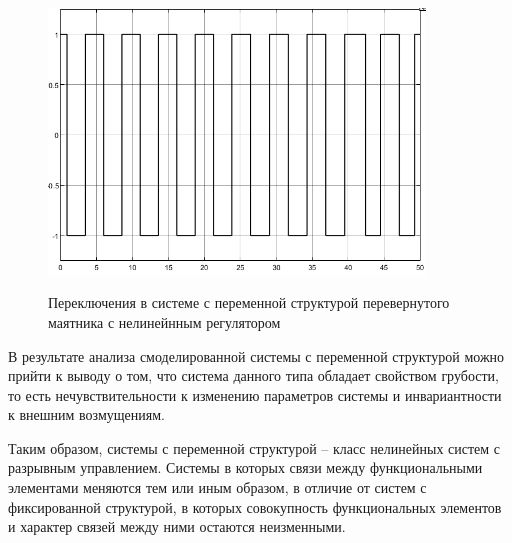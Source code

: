 \begin{figure}[h!]
\begin{center}
\includegraphics[angle=0,width=10cm]{fig/08.png}\\[2mm]
\caption{Переключения в системе с переменной структурой перевернутого маятника с нелинейнным регулятором}\label{fig:08}
\end{center}
\end{figure}

В результате анализа смоделированной системы с переменной структурой можно прийти к выводу о том, что система данного типа обладает свойством грубости, то есть нечувствительности к изменению параметров системы и инвариантности к внешним возмущениям.

Таким образом, системы с переменной структурой -- класс нелинейных систем с разрывным управлением. 
Системы в которых связи между функциональными элементами меняются тем или иным образом, в отличие от систем с фиксированной структурой, в которых совокупность функциональных элементов и характер связей между ними остаются неизменными.
